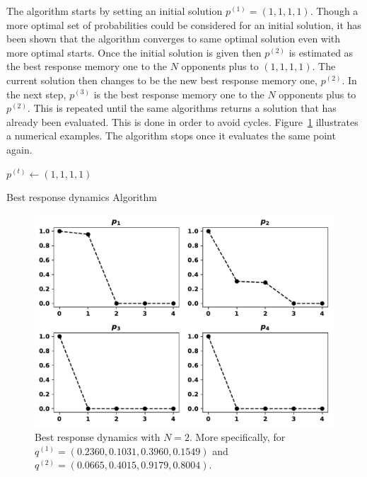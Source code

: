 \documentclass[10pt]{article}
\begin{document}
\begin{minipage}{0.60\linewidth}
The algorithm starts by setting an initial solution \(p^{(1)}=(1, 1, 1, 1)\). Though
a more optimal set of probabilities could be considered for an initial solution,
it has been shown that the algorithm converges to same optimal solution even with
more optimal starts. Once the initial solution is given then \(p^{(2)}\)
is estimated as the best response memory one to the \(N\) opponents plus to
\((1, 1, 1, 1)\).
The current solution then changes to be the new best response memory one, \(p^{(2)}\).
In the next step, \(p^{(3)}\) is the best response memory one to the \(N\) opponents plus to
\(p^{(2)}\). This is repeated until the same algorithms returns a solution that
has already been evaluated. This is done in order to avoid cycles.
Figure~\ref{fig:best_response_dynamics_results} illustrates a numerical
examples. The algorithm stops once it evaluates the same point again.
\end{minipage}
\hspace{1cm}
\begin{minipage}{0.30\linewidth}
\begin{algorithm}[H]
    $p^{(t)}\leftarrow (1, 1, 1, 1)$\;
    \caption{Best response dynamics Algorithm}
    \label{algo:best_response_dynamics}
\end{algorithm}
\end{minipage}

\begin{figure}
    \centering
    \includegraphics[width=.6\textwidth]{img/evolution_example_two.pdf}
    \caption{Best response dynamics with \(N=2\). More specifically, for
    \(q ^{(1)}=(0.2360,
                0.1031,
                0.3960,
                0.1549)\) and
    \(q ^{(2)}=(0.0665,
                0.4015,
                0.9179,
                0.8004)\).}
\label{fig:best_response_dynamics_results}
\end{figure}
\end{document}
